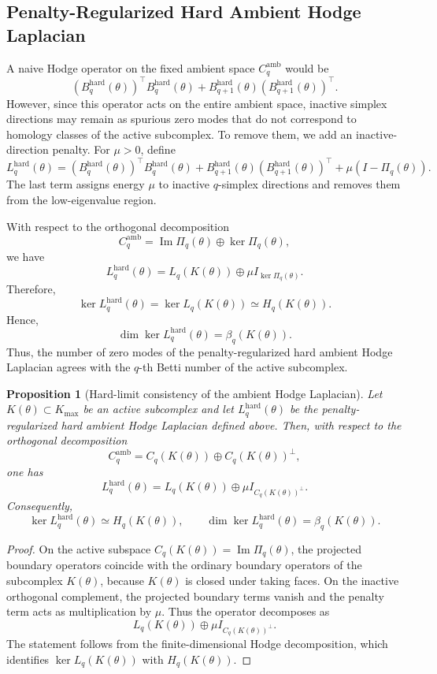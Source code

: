 \documentclass[pdflatex,sn-mathphys-ay]{sn-jnl}%
\theoremstyle{thmstyleone}%
\newtheorem{proposition}[theorem]{Proposition}%
\theoremstyle{thmstyletwo}%
\theoremstyle{thmstylethree}%
\begin{document}
\subsection{Penalty-Regularized Hard Ambient Hodge Laplacian}

A naive Hodge operator on the fixed ambient space \(C_q^{\mathrm{amb}}\) would be
\[
\left(
B_q^{\mathrm{hard}}(\theta)
\right)^\top
B_q^{\mathrm{hard}}(\theta)
+
B_{q+1}^{\mathrm{hard}}(\theta)
\left(
B_{q+1}^{\mathrm{hard}}(\theta)
\right)^\top.
\]
However, since this operator acts on the entire ambient space, inactive simplex directions may remain as spurious zero modes that do not correspond to homology classes of the active subcomplex. To remove them, we add an inactive-direction penalty. For \(\mu>0\), define
\[
L_q^{\mathrm{hard}}(\theta)
=
\left(
B_q^{\mathrm{hard}}(\theta)
\right)^\top
B_q^{\mathrm{hard}}(\theta)
+
B_{q+1}^{\mathrm{hard}}(\theta)
\left(
B_{q+1}^{\mathrm{hard}}(\theta)
\right)^\top
+
\mu
\left(
I-\Pi_q(\theta)
\right).
\]
The last term assigns energy \(\mu\) to inactive \(q\)-simplex directions and removes them from the low-eigenvalue region.

With respect to the orthogonal decomposition
\[
C_q^{\mathrm{amb}}
=
\operatorname{Im}\Pi_q(\theta)
\oplus
\ker\Pi_q(\theta),
\]
we have
\[
L_q^{\mathrm{hard}}(\theta)
=
L_q(K(\theta))
\oplus
\mu I_{\ker\Pi_q(\theta)}.
\]
Therefore,
\[
\ker L_q^{\mathrm{hard}}(\theta)
=
\ker L_q(K(\theta))
\simeq
H_q(K(\theta)).
\]
Hence,
\[
\dim\ker L_q^{\mathrm{hard}}(\theta)
=
\beta_q(K(\theta)).
\]
Thus, the number of zero modes of the penalty-regularized hard ambient Hodge Laplacian agrees with the \(q\)-th Betti number of the active subcomplex.


\begin{proposition}[Hard-limit consistency of the ambient Hodge Laplacian]
Let \(K(\theta)\subset K_{\max}\) be an active subcomplex and let \(L_q^{\mathrm{hard}}(\theta)\) be the penalty-regularized hard ambient Hodge Laplacian defined above. Then, with respect to the orthogonal decomposition
\[
C_q^{\mathrm{amb}}
=
C_q(K(\theta))\oplus C_q(K(\theta))^\perp,
\]
one has
\[
L_q^{\mathrm{hard}}(\theta)
=
L_q(K(\theta))\oplus \mu I_{C_q(K(\theta))^\perp}.
\]
Consequently,
\[
\ker L_q^{\mathrm{hard}}(\theta)
\simeq
H_q(K(\theta)),
\qquad
\dim\ker L_q^{\mathrm{hard}}(\theta)
=
\beta_q(K(\theta)).
\]
\end{proposition}

\begin{proof}
On the active subspace \(C_q(K(\theta))=\operatorname{Im}\Pi_q(\theta)\), the projected boundary operators coincide with the ordinary boundary operators of the subcomplex \(K(\theta)\), because \(K(\theta)\) is closed under taking faces. On the inactive orthogonal complement, the projected boundary terms vanish and the penalty term acts as multiplication by \(\mu\). Thus the operator decomposes as
\[
L_q(K(\theta))\oplus \mu I_{C_q(K(\theta))^\perp}.
\]
The statement follows from the finite-dimensional Hodge decomposition, which identifies \(\ker L_q(K(\theta))\) with \(H_q(K(\theta))\).
\end{proof}
\end{document}
